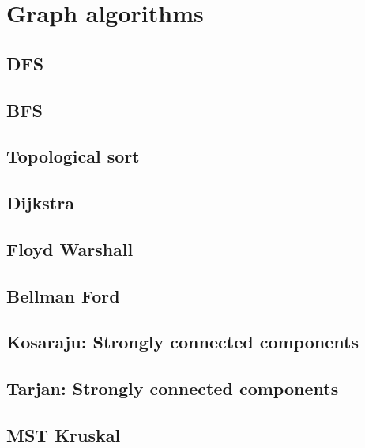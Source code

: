 \section{Graph algorithms}
\subsection{DFS}
\raggedbottom
\hrulefill
\subsection{BFS}
\raggedbottom
\hrulefill
\subsection{Topological sort}
\raggedbottom
\hrulefill
\subsection{Dijkstra}
\raggedbottom
\hrulefill
\subsection{Floyd Warshall}
\raggedbottom
\hrulefill
\subsection{Bellman Ford}
\raggedbottom
\hrulefill
\subsection{Kosaraju: Strongly connected components}
\raggedbottom
\hrulefill
\subsection{Tarjan: Strongly connected components}
\raggedbottom
\hrulefill
\subsection{MST Kruskal}
\raggedbottom
\hrulefill
